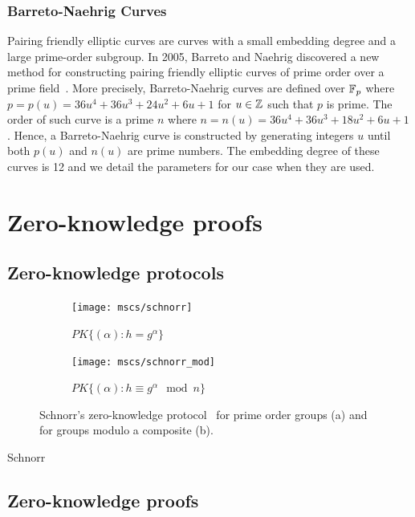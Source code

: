 \subsubsection{Barreto-Naehrig Curves}

Pairing friendly elliptic curves are curves with a small embedding degree and a
large prime-order subgroup. In 2005, Barreto and Naehrig discovered a new method
for constructing pairing friendly elliptic curves of prime order over a prime
field~\cite{BN06}. More precisely, Barreto-Naehrig curves are defined over
$\mathbb{F}_{p}$ where $p = p(u) = 36 u^4 + 36 u^3 + 24 u^2 + 6 u + 1$ for $u \in \mathbb{Z}$
such that $p$ is prime. The order of such curve is a prime $n$ where
$n = n(u) = 36 u^4 + 36 u^3 + 18 u^2 + 6 u + 1$. Hence, a Barreto-Naehrig curve
is constructed by generating integers $u$ until both $p(u)$ and $n(u)$ are prime
numbers. The embedding degree of these curves is 12 and we detail the parameters
for our case when they are used.

\section{Zero-knowledge proofs}

\subsection{Zero-knowledge protocols}

\begin{figure}
  \centering
  \begin{subfigure}[b]{0.45\textwidth}
    \texttt{[image: mscs/schnorr]}
    \caption{$PK\{(\alpha) : h = g^\alpha \}$}
    \label{msc:schnorr}
  \end{subfigure}
  \quad
  \begin{subfigure}[b]{0.45\textwidth}
    \texttt{[image: mscs/schnorr\_mod]}
    \caption{$PK\{(\alpha) : h \equiv g^\alpha \mod n \}$}
    \label{msc:schnorr_mod}
  \end{subfigure}
  \caption{Schnorr's zero-knowledge protocol~\cite{Schnorr1991} for prime order groups (a) and for groups modulo a composite (b).}
  \label{fig:schnorr}
\end{figure}

Schnorr

\subsection{Zero-knowledge proofs}

